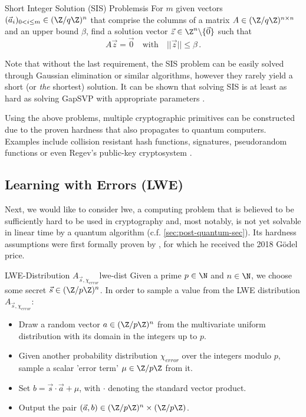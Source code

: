 \begin{definition}{Short Integer Solution (SIS) Problem}{sis}
  For $m$ given vectors $(\vec{a}_i)_{0 < i \leq m} \in (\Z / q\Z)^n$ that comprise the columns of a matrix
  $A \in (\Z / q\Z)^{n \times n}$ and an upper bound $\beta$, find
  a solution vector $\vec{z} \in \Z^n \backslash \{\vec{0}\}$ such that
  $$A \vec{z} = \vec{0} \quad \mathrm{with} \quad ||\vec{z}|| \leq \beta\,.$$
\end{definition}

Note that without the last requirement, the SIS problem can be easily solved through Gaussian elimination or similar algorithms, however they rarely yield a short (or \textit{the} shortest) solution.
It can be shown that solving SIS is at least as hard as solving GapSVP with appropriate parameters \parencite{1996-hard-lattice-problems}.

Using the above problems, multiple cryptographic primitives can be constructed due to the proven hardness that also propagates to quantum computers.
Examples include collision resistant hash functions, signatures, pseudorandom functions or even Regev's public-key cryptosystem \parencite{2016-decade-of-lattice}.



\subsection{Learning with Errors (LWE)}
\label{subsec:lwe}
Next, we would like to consider \Gls{lwe}, a computing problem that is believed to be sufficiently hard to be used in cryptography and, most notably, is not yet solvable in linear time by a quantum algorithm (c.f. \autoref{sec:post-quantum-sec}).
Its hardness assumptions were first formally proven by \citeauthor{2005-lwe-original}, for which he received the 2018 Gödel price.

\begin{definition}{LWE-Distribution $A_{\vec{s}, \chi_{error}}$}{lwe-dist}
  Given a prime $p \in \N$ and $n \in \N$, we choose some secret $\vec{s} \in (\Z / p \Z)^n$.
  In order to sample a value from the LWE distribution $A_{\vec{s}, \chi_{error}}$:
  \begin{itemize}
    \item Draw a random vector $a \in (\Z/p\Z)^n$ from the multivariate uniform distribution
          with its domain in the integers up to $p$.
    \item Given another probability distribution $\chi_{error}$ over the integers modulo $p$,
          sample a scalar 'error term' $\mu \in \Z / p \Z$ from it.
    \item Set $b = \vec{s} \cdot \vec{a} + \mu$, with $\cdot$ denoting the standard vector product.
    \item Output the pair $(\vec{a}, b) \in (\Z / p \Z)^n \times (\Z / p \Z)$.
  \end{itemize}
\end{definition}

